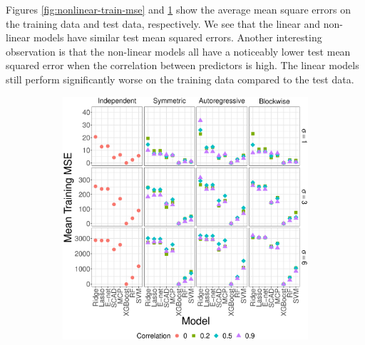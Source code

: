 \documentclass{article}
\begin{document}
	Figures \ref{fig:nonlinear-train-mse} and \ref{fig:nonlinear-test-mse} show the average mean square errors on the training data and test data, respectively. We see that the linear and non-linear models have similar test mean squared errors. Another interesting observation is that the non-linear models all have a noticeably lower test mean squared error when the correlation between predictors is high. The linear models still perform significantly worse on the training data compared to the test data. 
	\begin{figure}[!htb]
		\centering
		\begin{subfigure}[b]{0.47\textwidth}
			\includegraphics[width=\textwidth]{images/facet/publication_facet_train_mse_nonlinear_50_2000.eps}
			\label{fig:nonlinear-test-mse}
		\end{subfigure}
		\hspace{6pt}
		\begin{subfigure}[b]{0.47\textwidth}

\end{subfigure}
\end{figure}
\end{document}
